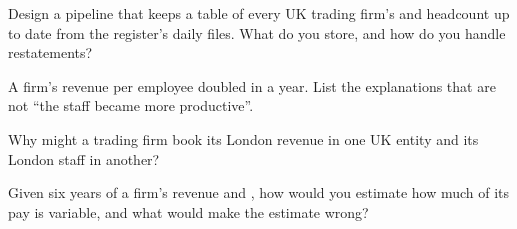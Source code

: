 \begin{interviewq}\label{iq:in:reading-a-trading-firms-accounts:3}
Design a pipeline that keeps a table of every UK trading firm's  and headcount up to date from the
register's daily files. What do you store, and how do you handle restatements?
\end{interviewq}

\begin{interviewq}\label{iq:in:reading-a-trading-firms-accounts:4}
A firm's revenue per employee doubled in a year. List the explanations that are not ``the staff became more
productive''.
\end{interviewq}

\begin{interviewq}\label{iq:in:reading-a-trading-firms-accounts:5}
Why might a trading firm book its London revenue in one UK entity and its London staff in another?
\end{interviewq}

\begin{interviewq}\label{iq:in:reading-a-trading-firms-accounts:6}
Given six years of a firm's revenue and , how would you estimate how much of its pay is variable, and what
would make the estimate wrong?
\end{interviewq}
